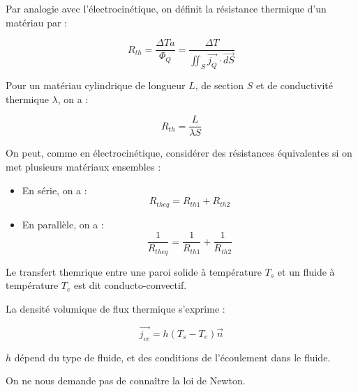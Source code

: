 \documentclass[a4paper,12pt]{book}
\newcommand{\Def}[2]{\begin{tcolorbox}[colback=white,colframe=red!10!green!20!blue!75!, title=Définition : #1]#2\end{tcolorbox}}
\newcommand{\Thr}[2]{\begin{tcolorbox}[sharp corners, colback=white,colframe=red!10!blue!30!green!75!, title=Théorème : #1]#2\end{tcolorbox}}
\renewcommand{\Vec}[1]{\overrightarrow{#1}}
\begin{document}
\Def{Résistance thermique}{Par analogie avec l'électrocinétique, on définit la résistance thermique d'un matériau par :
\par $$R_{th}=\dfrac{\Delta Ta}{\Phi_Q} = \dfrac{\Delta T}{\iint_S\Vec{j_Q}\cdot\Vec{dS}}$$
\par Pour un matériau cylindrique de longueur $L$, de section $S$ et de conductivité thermique $\lambda$, on a :
\par $$R_{th} = \frac{L}{\lambda S}$$
\par On peut, comme en électrocinétique, considérer des résistances équivalentes si on met plusieurs matériaux ensembles :\begin{itemize}
\item En série, on a : $$R_{theq} = R_{th1}+R_{th2}$$
\item En parallèle, on a : $$\frac{1}{R_{theq}} = \frac{1}{R_{th1}}+\frac{1}{R_{th2}}$$
\end{itemize}}
\Thr{Loi de Newton}{Le transfert themrique entre une paroi solide à température $T_s$ et un fluide à température $T_e$ est dit conducto-convectif.
\par La densité volumique de flux thermique s'exprime :
\par $$\Vec{j_{cc}} =h(T_s-T_e)\Vec{n}$$
\par $h$ dépend du type de fluide, et des conditions de l'écoulement dans le fluide.
\par On ne nous demande pas de connaître la loi de Newton.}
\end{document}
